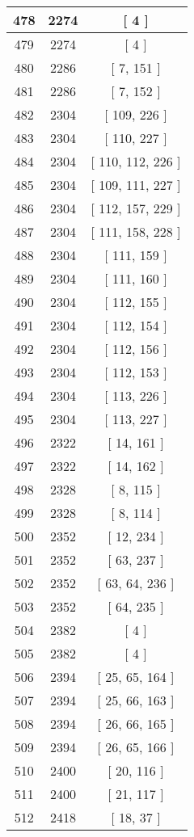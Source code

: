 \begin{center}
\begin{longtable}[H]{|| c c c ||}
\\\hline
478 & 2274 & [ 4 ]
\\\hline
479 & 2274 & [ 4 ]
\\\hline
480 & 2286 & [ 7, 151 ]
\\\hline
481 & 2286 & [ 7, 152 ]
\\\hline
482 & 2304 & [ 109, 226 ]
\\\hline
483 & 2304 & [ 110, 227 ]
\\\hline
484 & 2304 & [ 110, 112, 226 ]
\\\hline
485 & 2304 & [ 109, 111, 227 ]
\\\hline
486 & 2304 & [ 112, 157, 229 ]
\\\hline
487 & 2304 & [ 111, 158, 228 ]
\\\hline
488 & 2304 & [ 111, 159 ]
\\\hline
489 & 2304 & [ 111, 160 ]
\\\hline
490 & 2304 & [ 112, 155 ]
\\\hline
491 & 2304 & [ 112, 154 ]
\\\hline
492 & 2304 & [ 112, 156 ]
\\\hline
493 & 2304 & [ 112, 153 ]
\\\hline
494 & 2304 & [ 113, 226 ]
\\\hline
495 & 2304 & [ 113, 227 ]
\\\hline
496 & 2322 & [ 14, 161 ]
\\\hline
497 & 2322 & [ 14, 162 ]
\\\hline
498 & 2328 & [ 8, 115 ]
\\\hline
499 & 2328 & [ 8, 114 ]
\\\hline
500 & 2352 & [ 12, 234 ]
\\\hline
501 & 2352 & [ 63, 237 ]
\\\hline
502 & 2352 & [ 63, 64, 236 ]
\\\hline
503 & 2352 & [ 64, 235 ]
\\\hline
504 & 2382 & [ 4 ]
\\\hline
505 & 2382 & [ 4 ]
\\\hline
506 & 2394 & [ 25, 65, 164 ]
\\\hline
507 & 2394 & [ 25, 66, 163 ]
\\\hline
508 & 2394 & [ 26, 66, 165 ]
\\\hline
509 & 2394 & [ 26, 65, 166 ]
\\\hline
510 & 2400 & [ 20, 116 ]
\\\hline
511 & 2400 & [ 21, 117 ]
\\\hline
512 & 2418 & [ 18, 37 ]

\end{longtable}
\end{center}
